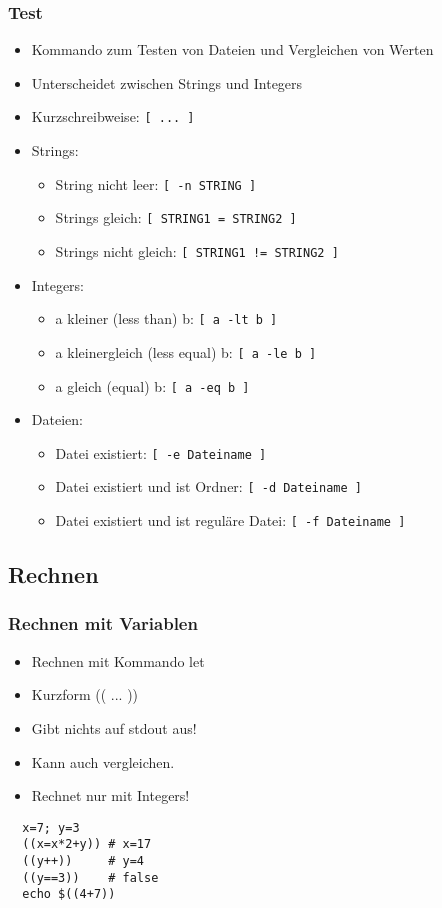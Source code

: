 \documentclass{beamer}
\begin{document}
\begin{frame}
 \frametitle{Test}
 
 \begin{itemize}
  \item Kommando zum Testen von Dateien und Vergleichen von Werten
  \item Unterscheidet zwischen Strings und Integers
  \item Kurzschreibweise: {\tt [ ... ]}
  \item Strings:
  \begin{itemize}
   \item String nicht leer: {\tt [ -n STRING ]}
   \item Strings gleich: {\tt [ STRING1 = STRING2 ]}
   \item Strings nicht gleich: {\tt [ STRING1 != STRING2 ]}
  \end{itemize}
 \item Integers:
 \begin{itemize}
  \item a kleiner (less than) b: {\tt [ a -lt b ]}
  \item a kleinergleich (less equal) b: {\tt [ a -le b ]}
  \item a gleich (equal) b: {\tt [ a -eq b ]}
 \end{itemize}
 \item Dateien:
 \begin{itemize}
  \item Datei existiert: {\tt [ -e Dateiname ]}
  \item Datei existiert und ist Ordner: {\tt [ -d Dateiname ]}
  \item Datei existiert und ist reguläre Datei: {\tt [ -f Dateiname ]}
 \end{itemize}
 \end{itemize}
\end{frame}

\subsection{Rechnen}
\begin{frame}[fragile]
 \frametitle{Rechnen mit Variablen}
 
 \begin{itemize}
  \item Rechnen mit Kommando let
  \item Kurzform (( ... ))
  \item Gibt nichts auf stdout aus!
  \item Kann auch vergleichen.
  \item Rechnet nur mit Integers!
 \end{itemize}
 \begin{lstlisting}
  x=7; y=3
  ((x=x*2+y)) # x=17
  ((y++))     # y=4
  ((y==3))    # false
  echo $((4+7))
 \end{lstlisting}
\end{frame}
\end{document}
